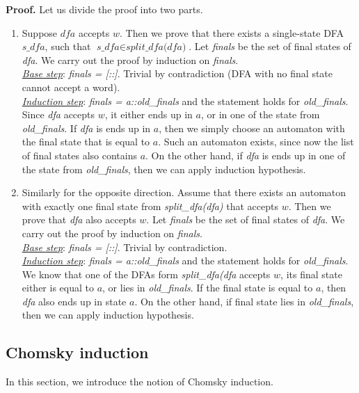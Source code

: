 \textbf{Proof.}
Let us divide the proof into two parts.
\begin{enumerate}
\item Suppose $\textit{dfa}$ accepts $w$. Then we prove that there exists a single-state DFA $\textit{s\_dfa}$, such that $\textit{s\_dfa} \in \textit{split\_dfa(dfa)}$. 
Let \textit{finals} be the set of final states of \textit{dfa}. We carry out the proof by induction on \textit{finals}. 
\\
\textit{\underline{Base step}}: \textit{finals = [::]}. Trivial by contradiction (DFA with no final state cannot accept a word).
\\
\textit{\underline{Induction step}}: \textit{finals = a::old\_finals} and the statement holds for \textit{old\_finals}. Since \textit{dfa} accepts $w$, it either ends up in $a$, or in one of the state from \textit{old\_finals}.
If \textit{dfa} is ends up in $a$, then we simply choose an automaton with the final state that is equal to $a$.
Such an automaton exists, since now the list of final states also contains $a$.
On the other hand, if \textit{dfa} is ends up in one of the state from \textit{old\_finals}, then we can apply induction hypothesis.

\item Similarly for the opposite direction. Assume that there exists an automaton with exactly one final state from \textit{split\_dfa(dfa)} that accepts $w$. Then we prove that \textit{dfa} also accepts $w$. 
Let \textit{finals} be the set of final states of \textit{dfa}. We carry out the proof by induction on \textit{finals}. 
\\
\textit{\underline{Base step}}: \textit{finals = [::]}. Trivial by contradiction.
\\
\textit{\underline{Induction step}}: \textit{finals = a::old\_finals} and the statement holds for \textit{old\_finals}.
We know that one of the DFAs form \textit{split\_dfa(dfa} accepts $w$, its final state either is equal to $a$, or lies in \textit{old\_finals}.
If the final state is equal to $a$, then \textit{dfa} also ends up in state $a$.
On the other hand, if final state lies in \textit{old\_finals}, then we can apply induction hypothesis.
\end{enumerate}


\subsection{Chomsky induction}

In this section, we introduce the notion of Chomsky induction.

